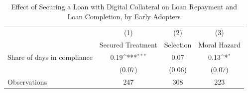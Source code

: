 \begin{table}[htbp]\centering
\def\sym#1{\ifmmode^{#1}\else\(^{#1}\)\fi}
\caption{Effect of Securing a Loan with Digital Collateral on Loan Repayment and Loan Completion, by Early Adopters\label{LASMH\_repay\_earlyadopt\_LATE\_200}}
\begin{tabular}{l*{3}{c}}
\toprule
                    &\multicolumn{1}{c}{(1)}&\multicolumn{1}{c}{(2)}&\multicolumn{1}{c}{(3)}\\
                    &\multicolumn{1}{c}{Secured Treatment}&\multicolumn{1}{c}{Selection}&\multicolumn{1}{c}{Moral Hazard}\\
\midrule
Share of days in compliance&        0.19\sym{***}&        0.07         &        0.13\sym{*}  \\
                    &      (0.07)         &      (0.06)         &      (0.07)         \\
\midrule
Observations        &         247         &         308         &         223         \\
\bottomrule
\end{tabular}
\end{table}
